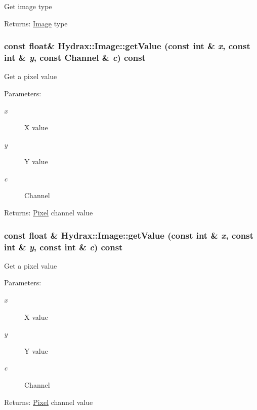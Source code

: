 \begin{CompactItemize}
Get image type \begin{Desc}
\item[Returns:]\hyperlink{class_hydrax_1_1_image}{Image} type \end{Desc}
\hypertarget{class_hydrax_1_1_image_1a021dc1afd9074172f512ecc2fe4d2e}{
\subsubsection[{getValue}]{\setlength{\rightskip}{0pt plus 5cm}const float\& Hydrax::Image::getValue (const int \& {\em x}, \/  const int \& {\em y}, \/  const {\bf Channel} \& {\em c}) const}}
\label{class_hydrax_1_1_image_1a021dc1afd9074172f512ecc2fe4d2e}


Get a pixel value \begin{Desc}
\item[Parameters:]
\begin{description}
\item[{\em x}]X value \item[{\em y}]Y value \item[{\em c}]Channel \end{description}
\end{Desc}
\begin{Desc}
\item[Returns:]\hyperlink{struct_hydrax_1_1_image_1_1_pixel}{Pixel} channel value \end{Desc}
\hypertarget{class_hydrax_1_1_image_3e05904d8904baf193e6687c938d1d5b}{
\subsubsection[{getValue}]{\setlength{\rightskip}{0pt plus 5cm}const float \& Hydrax::Image::getValue (const int \& {\em x}, \/  const int \& {\em y}, \/  const int \& {\em c}) const}}
\label{class_hydrax_1_1_image_3e05904d8904baf193e6687c938d1d5b}


Get a pixel value \begin{Desc}
\item[Parameters:]
\begin{description}
\item[{\em x}]X value \item[{\em y}]Y value \item[{\em c}]Channel \end{description}
\end{Desc}
\begin{Desc}
\item[Returns:]\hyperlink{struct_hydrax_1_1_image_1_1_pixel}{Pixel} channel value \end{Desc}
\hypertarget{class_hydrax_1_1_image_75d101bcf467cee66dbafc8c28479c2b}{
}
\end{CompactItemize}
